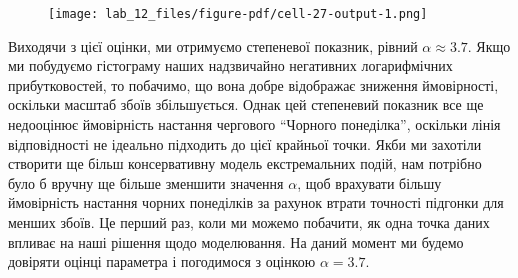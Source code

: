 \documentclass[
  letterpaper,
]{report}
\begin{document}
\begin{figure}[H]

{\centering \texttt{[image: lab\_12\_files/figure-pdf/cell-27-output-1.png]}

}

\end{figure}

Виходячи з цієї оцінки, ми отримуємо степеневої показник, рівний
\(\alpha \approx 3.7\). Якщо ми побудуємо гістограму наших надзвичайно
негативних логарифмічних прибутковостей, то побачимо, що вона добре
відображає зниження ймовірності, оскільки масштаб збоїв збільшується.
Однак цей степеневий показник все ще недооцінює ймовірність настання
чергового ``Чорного понеділка'', оскільки лінія відповідності не
ідеально підходить до цієї крайньої точки. Якби ми захотіли створити ще
більш консервативну модель екстремальних подій, нам потрібно було б
вручну ще більше зменшити значення \(\alpha\), щоб врахувати більшу
ймовірність настання чорних понеділків за рахунок втрати точності
підгонки для менших збоїв. Це перший раз, коли ми можемо побачити, як
одна точка даних впливає на наші рішення щодо моделювання. На даний
момент ми будемо довіряти оцінці параметра і погодимося з оцінкою
\(\alpha=3.7\).
\end{document}
